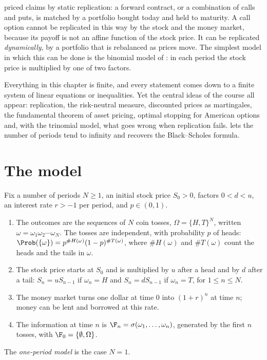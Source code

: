 
 priced claims by static replication: a forward contract, or a
combination of calls and puts, is matched by a portfolio bought today and held to
maturity. A call option cannot be replicated in this way by the stock and the money
market, because its payoff is not an affine function of the stock price. It can be
replicated \emph{dynamically}, by a portfolio that is rebalanced as prices move. The
simplest model in which this can be done is the binomial model of \textcite{crr1979}: in
each period the stock price is multiplied by one of two factors.

Everything in this chapter is finite, and every statement comes down to a finite system
of linear equations or inequalities. Yet the central ideas of the course all appear:
replication, the risk-neutral measure, discounted prices as martingales, the fundamental
theorem of asset pricing, optimal stopping for American options and, with the trinomial
model, what goes wrong when replication fails.  lets the number of periods tend to
infinity and recovers the Black--Scholes formula.

\section{The model}\label{sec:bin-model}

\begin{definition}\label{def:bin-model}
Fix a number of periods $N\ge1$, an initial stock price $S_0>0$, factors $0<d<u$, an
interest rate $r>-1$ per period, and $p\in(0,1)$.
\begin{enumerate}[label=(\roman*)]
  \item The outcomes are the sequences of $N$ coin tosses, $\Omega=\{H,T\}^N$, written
    $\omega=\omega_1\omega_2\cdots\omega_N$. The tosses are independent, with probability
    $p$ of heads: $\Prob(\{\omega\})=p^{\#H(\omega)}(1-p)^{\#T(\omega)}$, where
    $\#H(\omega)$ and $\#T(\omega)$ count the heads and the tails in $\omega$.
  \item The stock price starts at $S_0$ and is multiplied by $u$ after a head and by $d$
    after a tail: $S_n=uS_{n-1}$ if $\omega_n=H$ and $S_n=dS_{n-1}$ if $\omega_n=T$, for
    $1\le n\le N$.
  \item The money market turns one dollar at time $0$ into $(1+r)^n$ at time $n$; money
    can be lent and borrowed at this rate.
  \item The information at time $n$ is $\F_n=\sigma(\omega_1,\dots,\omega_n)$, generated
    by the first $n$ tosses, with $\F_0=\{\emptyset,\Omega\}$.
\end{enumerate}
The \emph{one-period model} is the case $N=1$.
\end{definition}

